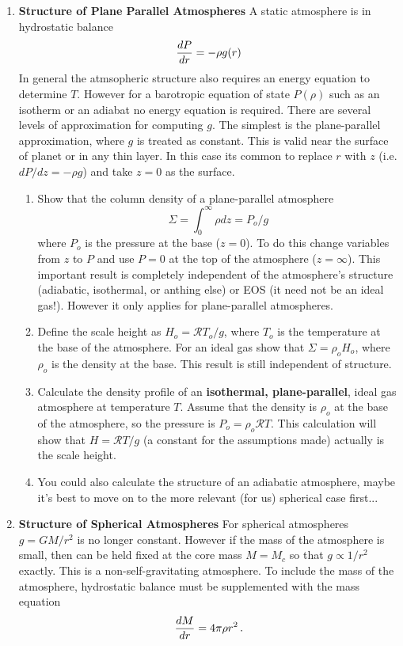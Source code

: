 \documentclass[11pt]{article}
\newcommand{\Rg}{\mathcal{R}}
\begin{document}
\begin{enumerate}
\item {\bf Structure of Plane Parallel Atmospheres} A static atmosphere is in hydrostatic balance
\begin{equation}\label{eq:HB}
{dP \over dr} = - \rho g(r)
\end{equation} 
In general the atmsopheric structure also requires an energy equation to determine $T$.  However for a barotropic equation of state $P(\rho)$ such as an isotherm or an adiabat no energy equation is required.  There are several levels of approximation for computing $g$.  The simplest is the plane-parallel approximation, where $g$ is treated as constant.  This is valid near the surface of planet or in any thin layer.  In this case its common to replace $r$ with $z$ (i.e. $dP/dz = - \rho g$) and take $z = 0$ as the surface. 
\begin{enumerate}
\item  Show that the column density of a plane-parallel atmosphere
\begin{equation}
\varSigma = \int_0^\infty \rho dz = P_o/g
\end{equation} 
where $P_o$ is the pressure at the base ($z = 0$).  To do this change variables from $z$ to $P$ and use $P = 0$ at the top of the atmosphere ($z = \infty$).  This important result is completely independent of the atmosphere's structure (adiabatic, isothermal, or anthing else) or EOS (it need not be an ideal gas!).  However it only applies for plane-parallel atmospheres.
\item Define the scale height as $H_o =  \Rg T_o/g$, where $T_o$ is the temperature at the base of the atmosphere.  For an ideal gas show that $\varSigma = \rho_o H_o$, where $\rho_o$ is the density at the base.  This result is still independent of structure.
\item Calculate the density profile of an {\bf isothermal, plane-parallel}, ideal gas atmosphere at temperature $T$.  Assume that the density is $\rho_o$ at the base of the atmosphere, so the pressure is $P_o = \rho_o \Rg T$.  This calculation will show that $H = \Rg T/g$ (a constant for the assumptions made) actually is the scale height.
\item You could also calculate the structure of an adiabatic atmosphere, maybe it's best to move on to the more relevant (for us) spherical case first...

\end{enumerate}

\item {\bf Structure of Spherical Atmospheres}
For spherical atmospheres $g = G M/r^2$ is no longer constant.  However if the mass of the atmosphere is small, then can be held fixed at the core mass $M = M_c$ so that $g \propto 1/r^2$ exactly.  This is a non-self-gravitating atmosphere.  To include the mass of the atmosphere, hydrostatic balance must be supplemented with the mass equation
\begin{equation}
{d M \over dr} = 4 \pi \rho r^2\, .
\end{equation} 


\end{enumerate}
\end{document}
